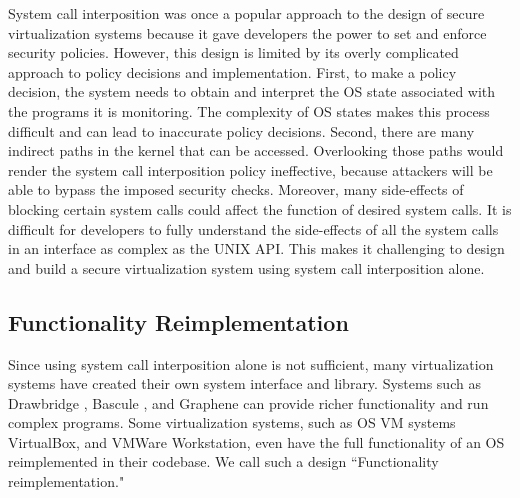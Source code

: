 System call interposition was once a popular approach to the design of secure
virtualization systems because it gave developers the power to set and enforce
security policies. 
  However, this design
is limited by its overly complicated approach to policy decisions and implementation.
First, to make a policy decision, the system needs to
obtain and interpret the OS state associated with the programs it is monitoring.
The complexity of OS states makes this process difficult and can lead to
inaccurate policy decisions.
Second, there are many indirect paths in the kernel that can be accessed.
Overlooking those paths would render the
system call interposition policy ineffective, because attackers will be able to
bypass the imposed security checks. Moreover, many side-effects of blocking
certain system calls could affect the function of desired system calls. 
It is difficult for developers to fully understand the side-effects of all the
system calls in an interface as complex as the UNIX API. This makes
it challenging to design and build a secure virtualization system using
system call interposition alone. 

\subsection{Functionality Reimplementation}
Since using system call interposition alone is not sufficient, 
many virtualization systems have created their own system
interface and library. Systems such as  Drawbridge \cite{Drawbridge-11},
 Bascule \cite{Bascule}, and Graphene \cite{Graphene-14} can
provide richer functionality and run complex programs. Some virtualization
systems, such as OS VM systems VirtualBox, and VMWare Workstation, even have the
full functionality of an OS reimplemented in their codebase. We call such a design 
``Functionality reimplementation."
 
